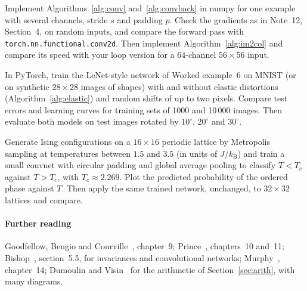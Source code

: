 \documentclass[11pt]{article}
\begin{document}
\begin{questions}
\begin{programming}
\item Implement Algorithms~\ref{alg:conv} and~\ref{alg:convback} in numpy for one example with several channels, stride $s$ and
  padding $p$. Check the gradients as in Note~12, Section~4, on random inputs, and compare the
  forward pass with \texttt{torch.nn.functional.conv2d}. Then implement Algorithm~\ref{alg:im2col} and compare its speed
  with your loop version for a $64$-channel $56 \times 56$ input.
\item In PyTorch, train the LeNet-style network of Worked example~6 on MNIST (or on synthetic $28 \times 28$ images of
  shapes) with and without elastic distortions (Algorithm~\ref{alg:elastic}) and random shifts of up to two pixels.
  Compare test errors and learning curves for training sets of 1000 and 10\,000 images. Then evaluate both models on test
  images rotated by $10^\circ$, $20^\circ$ and $30^\circ$.
\item Generate Ising configurations on a $16 \times 16$ periodic lattice by Metropolis sampling at temperatures between $1.5$
  and $3.5$ (in units of $J/k_{\mathrm B}$) and train a small convnet with circular padding and global average pooling to
  classify $T < T_c$ against $T > T_c$, with $T_c \approx 2.269$. Plot the predicted probability of the ordered phase against
  $T$. Then apply the same trained network, unchanged, to $32 \times 32$ lattices and compare.
\end{programming}
\end{questions}

\paragraph{Further reading} Goodfellow, Bengio and Courville~\cite{goodfellow2016}, chapter~9; Prince~\cite{prince2023},
chapters~10 and~11; Bishop~\cite{bishop2006}, section~5.5, for invariances and convolutional networks; Murphy~\cite{murphy2022},
chapter~14; Dumoulin and Visin~\cite{dumoulin2016} for the arithmetic of Section~\ref{sec:arith}, with many diagrams.
\end{document}
